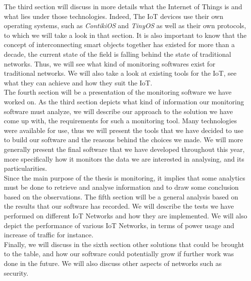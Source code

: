 The third section will discuss in more details what the Internet of Things is and what lies under those technologies. Indeed, The IoT devices use their own operating systems, such as \textit{ContikiOS} and \textit{TinyOS} as well as their own protocols, to which we will take a look in that section. It is also important to know that the concept of interconnecting smart objects together has existed for more than a decade, the current state of the field is falling behind the state of traditional networks. Thus, we will see what kind of monitoring softwares exist for traditional networks. We will also take a look at existing tools for the IoT, see what they can achieve and how they suit the IoT.\\

The fourth section will be a presentation of the monitoring software we have worked on. As the third section depicts what kind of information our monitoring software must analyze, we will describe our approach to the solution we have come up with, the requirements for such a monitoring tool. Many technologies were available for use, thus we will present the tools that we have decided to use to build our software and the reasons behind the choices we made. We will more generally present the final software that we have developed throughout this year, more specifically how it monitors the data we are interested in analysing, and its particularities. \\

Since the main purpose of the thesis is monitoring, it implies that some analytics must be done to retrieve and analyse information and to draw some conclusion based on the observations. The fifth section will be a general analysis based on the results that our software has recorded. We will describe the tests we have performed on different IoT Networks and how they are implemented. We will also depict the performance of various IoT Networks, in terms of power usage and increase of traffic for instance.\\

Finally, we will discuss in the sixth section other solutions that could be brought to the table, and how our software could potentially grow if further work was done in the future. We will also discuss other aspects of networks such as security.

